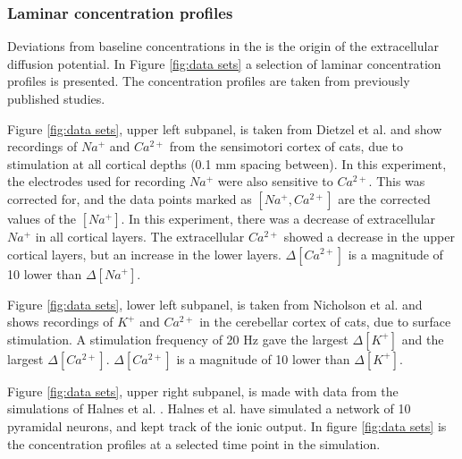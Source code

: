 \documentclass{article}
\begin{document}
\subsubsection{Laminar concentration profiles}

Deviations from baseline concentrations in the is the origin of the extracellular diffusion potential. In Figure \ref{fig:data sets} a selection of laminar concentration profiles is presented. The concentration profiles are taken from previously published studies. 

Figure \ref{fig:data sets}, upper left subpanel, is taken from Dietzel et al.\cite{Dietzel1982}  and show recordings of $Na^+$ and $Ca^{2+}$ from the sensimotori cortex of cats, due to stimulation at all cortical depths (0.1 mm spacing between).  In this experiment, the electrodes used for recording $Na^+$ were also sensitive to $Ca^{2+}$. This was corrected for, and the data points marked as $[Na^+, Ca^{2+}]$ are the corrected values of the $[Na^+]$. In this experiment, there was a decrease of extracellular $Na^+$ in all cortical layers. The extracellular $Ca^{2+}$ showed a decrease in the upper cortical layers, but an increase in the lower layers. $\Delta [Ca^{2+}]$ is  a magnitude of 10 lower than  $\Delta [Na^+]$.

Figure \ref{fig:data sets}, lower left subpanel, is taken from Nicholson et al.\cite{Nicholson1987} and shows recordings of $K^+$ and $Ca^{2+}$ in the cerebellar cortex of cats, due to surface stimulation. A stimulation frequency of 20 Hz gave the largest $\Delta [K^+]$ and the largest $\Delta [Ca^{2+}]$.   $\Delta [Ca^{2+}]$ is  a magnitude of 10 lower than  $\Delta [K^+]$.


Figure \ref{fig:data sets}, upper right subpanel, is made with data from the simulations of Halnes et al. \cite{Halnes2016}. Halnes et al. have simulated a network of 10 pyramidal neurons, and kept track of the ionic output. In figure \ref{fig:data sets} is the concentration profiles at a selected time point in the simulation.
\end{document}
